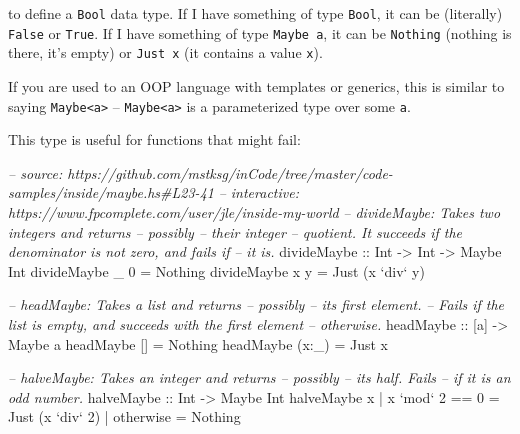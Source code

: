 \documentclass[]{article}
\newenvironment{Shaded}{\begin{snugshade}}{\end{snugshade}}
\newcommand{\CommentTok}[1]{\textcolor[rgb]{0.56,0.35,0.01}{\textit{#1}}}
\newcommand{\DataTypeTok}[1]{\textcolor[rgb]{0.13,0.29,0.53}{#1}}
\newcommand{\DecValTok}[1]{\textcolor[rgb]{0.00,0.00,0.81}{#1}}
\newcommand{\FunctionTok}[1]{\textcolor[rgb]{0.00,0.00,0.00}{#1}}
\newcommand{\NormalTok}[1]{#1}
\newcommand{\OtherTok}[1]{\textcolor[rgb]{0.56,0.35,0.01}{#1}}
\begin{document}
to define a \texttt{Bool} data type. If I have something of type \texttt{Bool},
it can be (literally) \texttt{False} or \texttt{True}. If I have something of
type \texttt{Maybe\ a}, it can be \texttt{Nothing} (nothing is there, it's
empty) or \texttt{Just\ x} (it contains a value \texttt{x}).

If you are used to an OOP language with templates or generics, this is similar
to saying \texttt{Maybe\textless{}a\textgreater{}} --
\texttt{Maybe\textless{}a\textgreater{}} is a parameterized type over some
\texttt{a}.

This type is useful for functions that might fail:

\begin{Shaded}
\begin{Highlighting}[]
\CommentTok{-- source: https://github.com/mstksg/inCode/tree/master/code-samples/inside/maybe.hs#L23-41}
\CommentTok{-- interactive: https://www.fpcomplete.com/user/jle/inside-my-world}
\CommentTok{-- divideMaybe: Takes two integers and returns -- possibly -- their integer}
\CommentTok{--      quotient. It succeeds if the denominator is not zero, and fails if}
\CommentTok{--      it is.}
\OtherTok{divideMaybe ::} \DataTypeTok{Int} \OtherTok{->} \DataTypeTok{Int} \OtherTok{->} \DataTypeTok{Maybe} \DataTypeTok{Int}
\NormalTok{divideMaybe _ }\DecValTok{0} \FunctionTok{=} \DataTypeTok{Nothing}
\NormalTok{divideMaybe x y }\FunctionTok{=} \DataTypeTok{Just}\NormalTok{ (x }\OtherTok{`div`}\NormalTok{ y)}

\CommentTok{-- headMaybe: Takes a list and returns -- possibly -- its first element.}
\CommentTok{--      Fails if the list is empty, and succeeds with the first element}
\CommentTok{--      otherwise.}
\OtherTok{headMaybe ::}\NormalTok{ [a] }\OtherTok{->} \DataTypeTok{Maybe}\NormalTok{ a}
\NormalTok{headMaybe []    }\FunctionTok{=} \DataTypeTok{Nothing}
\NormalTok{headMaybe (x}\FunctionTok{:}\NormalTok{_) }\FunctionTok{=} \DataTypeTok{Just}\NormalTok{ x}

\CommentTok{-- halveMaybe: Takes an integer and returns -- possibly -- its half.  Fails}
\CommentTok{--      if it is an odd number.}
\OtherTok{halveMaybe ::} \DataTypeTok{Int} \OtherTok{->} \DataTypeTok{Maybe} \DataTypeTok{Int}
\NormalTok{halveMaybe x }\FunctionTok{|}\NormalTok{ x }\OtherTok{`mod`} \DecValTok{2} \FunctionTok{==} \DecValTok{0} \FunctionTok{=} \DataTypeTok{Just}\NormalTok{ (x }\OtherTok{`div`} \DecValTok{2}\NormalTok{)}
             \FunctionTok{|}\NormalTok{ otherwise      }\FunctionTok{=} \DataTypeTok{Nothing}
\end{Highlighting}
\end{Shaded}
\end{document}
